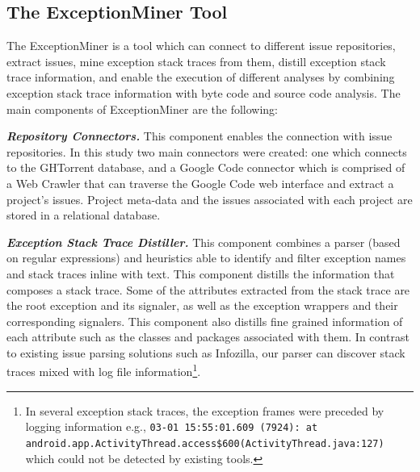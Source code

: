 \subsection{The ExceptionMiner Tool}
\label{sec:exceptionminer}

The ExceptionMiner is a tool which can connect to different issue repositories, 
extract issues, mine exception stack traces from them, distill exception stack trace information,
and enable the execution of different analyses by combining exception stack 
trace information with byte code and source code analysis. The main components of ExceptionMiner are the following:

\emph{\textbf{Repository Connectors.}} This component enables the connection 
with issue repositories. In this study two main connectors were created: one which connects to 
the GHTorrent database, and a Google Code connector which is comprised of a Web Crawler
 that can traverse the Google Code web interface and extract a project's issues. 
Project meta-data and the issues associated with each project are stored in a relational 
database.

\emph{\textbf{Exception Stack Trace Distiller.}}
This component combines a parser (based on regular expressions) 
and heuristics able to identify and filter exception names and stack traces inline with text. 
This component distills the information that composes a stack trace.
 Some of the attributes extracted from the stack trace are
 the root exception and its signaler, as well as the exception wrappers and their corresponding signalers. 
This component also distills fine grained information of each attribute such as the classes and packages associated with them.
In contrast to existing issue parsing solutions such as Infozilla, our parser
 can discover stack traces mixed with log file information\footnote{In several 
exception stack traces, the exception frames were preceded by logging information e.g., 
\texttt{03-01 15:55:01.609 (7924): at android.app.ActivityThread.access\$600(ActivityThread\-.java:127)} which could not be detected by existing tools.}.

